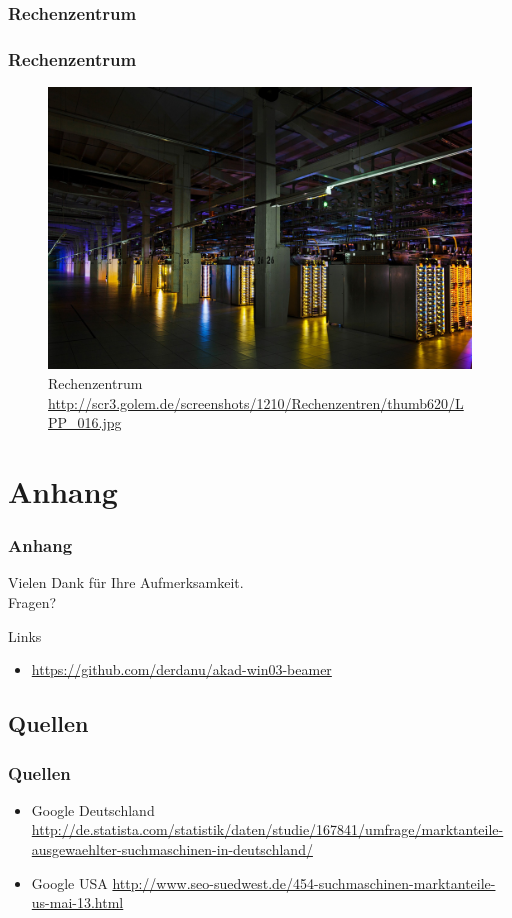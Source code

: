 \documentclass[xcolor=dvipsnames]{beamer}
\begin{document}
\subsubsection{Rechenzentrum}
\begin{frame}
  \frametitle{Rechenzentrum}
	\begin{figure}
		\includegraphics[scale=0.1]{LPP_016.jpg}
		\caption{Rechenzentrum \\ \tiny{\textcolor{gray}{\url{http://scr3.golem.de/screenshots/1210/Rechenzentren/thumb620/LPP_016.jpg}}}}
		\end{figure}
\end{frame}



\section{Anhang}
\begin{frame}
  \frametitle{Anhang} %
	\begin{block}{}	
		\begin{center}
			Vielen Dank für Ihre Aufmerksamkeit. \\
			Fragen?
		\end{center}	
	\end{block}
	\begin{block}{Links}	
		\begin{itemize}
			\item \url{https://github.com/derdanu/akad-win03-beamer}	
		\end{itemize}
	\end{block}
\end{frame}

\subsection{Quellen}
\begin{frame} %
  \frametitle{Quellen} %
 	\begin{itemize}
		\item Google Deutschland \url{http://de.statista.com/statistik/daten/studie/167841/umfrage/marktanteile-ausgewaehlter-suchmaschinen-in-deutschland/}
		\item Google USA \url{http://www.seo-suedwest.de/454-suchmaschinen-marktanteile-us-mai-13.html
}
	\end{itemize}
\end{frame}
\end{document}
